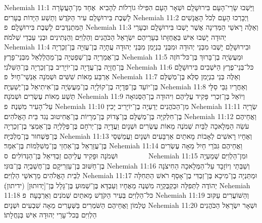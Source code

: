 Nehemiah 11:1	וַיֵּשְׁבוּ שָׂרֵי־הָעָם בִּירוּשָׁלָ͏ִם וּשְׁאָר הָעָם הִפִּילוּ גוֹרָלוֹת לְהָבִיא  אֶחָד מִן־הָעֲשָׂרָה לָשֶׁבֶת בִּירוּשָׁלַ͏ִם עִיר הַקֹּדֶשׁ וְתֵשַׁע הַיָּדוֹת בֶּעָרִים׃
Nehemiah 11:2	וַיְבָרְכוּ הָעָם לְכֹל הָאֲנָשִׁים הַמִּתְנַדְּבִים לָשֶׁבֶת בִּירוּשָׁלָ͏ִם׃ {פ}
Nehemiah 11:3	וְאֵלֶּה רָאשֵׁי הַמְּדִינָה אֲשֶׁר יָשְׁבוּ בִּירוּשָׁלָ͏ִם וּבְעָרֵי יְהוּדָה יָשְׁבוּ אִישׁ בַּאֲחֻזָּתוֹ בְּעָרֵיהֶם יִשְׂרָאֵל הַכֹּהֲנִים וְהַלְוִיִּם וְהַנְּתִינִים וּבְנֵי עַבְדֵי שְׁלֹמֹה׃
Nehemiah 11:4	וּבִירוּשָׁלַ͏ִם יָשְׁבוּ מִבְּנֵי יְהוּדָה וּמִבְּנֵי בִנְיָמִן מִבְּנֵי יְהוּדָה עֲתָיָה בֶן־עֻזִּיָּה בֶּן־זְכַרְיָה בֶן־אֲמַרְיָה בֶּן־שְׁפַטְיָה בֶן־מַהֲלַלְאֵל מִבְּנֵי־פָרֶץ׃
Nehemiah 11:5	וּמַעֲשֵׂיָה בֶן־בָּרוּךְ בֶּן־כּל־חֹזֶה בֶּן־חֲזָיָה בֶן־עֲדָיָה בֶן־יוֹיָרִיב בֶּן־זְכַרְיָה בֶּן־הַשִּׁלֹנִי׃
Nehemiah 11:6	כּל־בְּנֵי־פֶרֶץ הַיֹּשְׁבִים בִּירוּשָׁלָ͏ִם אַרְבַּע מֵאוֹת שִׁשִּׁים וּשְׁמֹנָה אַנְשֵׁי־חָיִל׃ {פ}
Nehemiah 11:7	וְאֵלֶּה בְּנֵי בִנְיָמִן סַלֻּא בֶּן־מְשֻׁלָּם בֶּן־יוֹעֵד בֶּן־פְּדָיָה בֶן־קוֹלָיָה בֶן־מַעֲשֵׂיָה בֶּן־אִיתִיאֵל בֶּן־יְשַׁעְיָה׃
Nehemiah 11:8	וְאַחֲרָיו גַּבַּי סַלָּי תְּשַׁע מֵאוֹת עֶשְׂרִים וּשְׁמֹנָה׃
Nehemiah 11:9	וְיוֹאֵל בֶּן־זִכְרִי פָּקִיד עֲלֵיהֶם וִיהוּדָה בֶן־הַסְּנוּאָה עַל־הָעִיר מִשְׁנֶה׃ {פ}
Nehemiah 11:10	מִן־הַכֹּהֲנִים יְדַעְיָה בֶן־יוֹיָרִיב יָכִין׃
Nehemiah 11:11	שְׂרָיָה בֶן־חִלְקִיָּה בֶּן־מְשֻׁלָּם בֶּן־צָדוֹק בֶּן־מְרָיוֹת בֶּן־אֲחִיטוּב נְגִד בֵּית הָאֱלֹהִים׃
Nehemiah 11:12	וַאֲחֵיהֶם עֹשֵׂה הַמְּלָאכָה לַבַּיִת שְׁמֹנֶה מֵאוֹת עֶשְׂרִים וּשְׁנָיִם וַעֲדָיָה בֶּן־יְרֹחָם בֶּן־פְּלַלְיָה בֶּן־אַמְצִי בֶן־זְכַרְיָה בֶּן־פַּשְׁחוּר בֶּן־מַלְכִּיָּה׃
Nehemiah 11:13	וְאֶחָיו רָאשִׁים לְאָבוֹת מָאתַיִם אַרְבָּעִים וּשְׁנָיִם וַעֲמַשְׁסַי בֶּן־עֲזַרְאֵל בֶּן־אַחְזַי בֶּן־מְשִׁלֵּמוֹת בֶּן־אִמֵּר׃
Nehemiah 11:14	וַאֲחֵיהֶם גִּבֹּרֵי חַיִל מֵאָה עֶשְׂרִים וּשְׁמֹנָה וּפָקִיד עֲלֵיהֶם זַבְדִּיאֵל בֶּן־הַגְּדוֹלִים׃ {ס}        
Nehemiah 11:15	וּמִן־הַלְוִיִּם שְׁמַעְיָה בֶן־חַשּׁוּב בֶּן־עַזְרִיקָם בֶּן־חֲשַׁבְיָה בֶּן־בּוּנִּי׃
Nehemiah 11:16	וְשַׁבְּתַי וְיוֹזָבָד עַל־הַמְּלָאכָה הַחִיצֹנָה לְבֵית הָאֱלֹהִים מֵרָאשֵׁי הַלְוִיִּם׃
Nehemiah 11:17	וּמַתַּנְיָה בֶן־מִיכָא בֶּן־זַבְדִּי בֶן־אָסָף רֹאשׁ הַתְּחִלָּה יְהוֹדֶה לַתְּפִלָּה וּבַקְבֻּקְיָה מִשְׁנֶה מֵאֶחָיו וְעַבְדָּא בֶּן־שַׁמּוּעַ בֶּן־גָּלָל בֶּן־[יְדוּתוּן] (ידיתון)׃
Nehemiah 11:18	כּל־הַלְוִיִּם בְּעִיר הַקֹּדֶשׁ מָאתַיִם שְׁמֹנִים וְאַרְבָּעָה׃ {פ}
Nehemiah 11:19	וְהַשּׁוֹעֲרִים עַקּוּב טַלְמוֹן וַאֲחֵיהֶם הַשֹּׁמְרִים בַּשְּׁעָרִים מֵאָה שִׁבְעִים וּשְׁנָיִם׃
Nehemiah 11:20	וּשְׁאָר יִשְׂרָאֵל הַכֹּהֲנִים הַלְוִיִּם בְּכל־עָרֵי יְהוּדָה אִישׁ בְּנַחֲלָתוֹ׃
